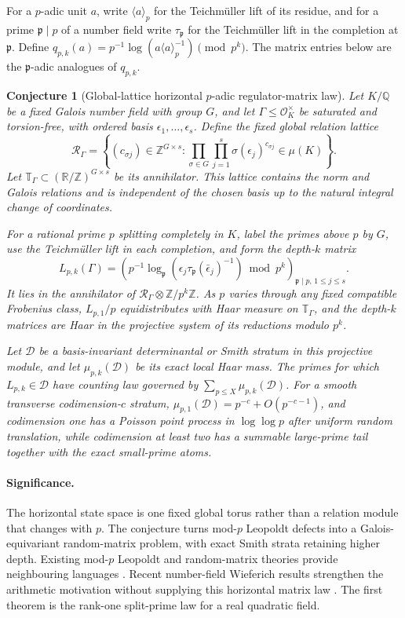 \documentclass[11pt]{article}
\newtheorem{conjecture}{Conjecture}
\newcommand{\Z}{\mathbb Z}
\newcommand{\Q}{\mathbb Q}
\newcommand{\R}{\mathbb R}
\begin{document}
For a $p$-adic unit $a$, write $\langle a\rangle_p$ for the Teichm\"uller lift of
its residue, and for a prime $\mathfrak p\mid p$ of a number field write
$\tau_{\mathfrak p}$ for the Teichm\"uller lift in the completion at
$\mathfrak p$.  Define
$ q_{p,k}(a)=p^{-1}\log(a\langle a\rangle_p^{-1})\pmod{p^k}$.  The matrix entries
below are the $\mathfrak p$-adic analogues of $q_{p,k}$.

\begin{conjecture}[Global-lattice horizontal $p$-adic regulator-matrix law]\label{c14}
Let $K/\Q$ be a fixed Galois number field with group $G$, and let
$\Gamma\le\mathcal O_K^\times$ be saturated and torsion-free, with ordered basis
$\epsilon_1,\ldots,\epsilon_s$.  Define the fixed global relation lattice
\[
 \mathcal R_\Gamma=
 \left\{(c_{\sigma j})\in\Z^{G\times s}:
   \prod_{\sigma\in G}\prod_{j=1}^s
   \sigma(\epsilon_j)^{c_{\sigma j}}\in\mu(K)\right\}.
\]
Let $\mathbb T_\Gamma\subset(\R/\Z)^{G\times s}$ be its annihilator.  This lattice
contains the norm and Galois relations and is independent of the chosen basis up to the
natural integral change of coordinates.

For a rational prime $p$ splitting completely in $K$, label the primes above $p$ by
$G$, use the Teichm\"uller lift in each completion, and form the depth-$k$ matrix
\[
 L_{p,k}(\Gamma)=
 \left(p^{-1}\log_{\mathfrak p}
   (\epsilon_j\tau_{\mathfrak p}(\bar\epsilon_j)^{-1})
   \bmod p^k\right)_{\mathfrak p\mid p,\,1\le j\le s}.
\]
It lies in the annihilator of
$\mathcal R_\Gamma\otimes\Z/p^k\Z$.  As $p$ varies through any fixed compatible
Frobenius class, $L_{p,1}/p$ equidistributes with Haar measure on
$\mathbb T_\Gamma$, and the depth-$k$ matrices are Haar in the projective system of its
reductions modulo $p^k$.

Let $\mathcal D$ be a basis-invariant determinantal or Smith stratum in this projective
module, and let $\mu_{p,k}(\mathcal D)$ be its exact local Haar mass.  The primes for
which $L_{p,k}\in\mathcal D$ have counting law governed by
$\sum_{p\le X}\mu_{p,k}(\mathcal D)$.  For a smooth transverse codimension-$c$ stratum,
$\mu_{p,1}(\mathcal D)=p^{-c}+O(p^{-c-1})$, and codimension one has a Poisson point process
in $\log\log p$ after uniform random translation, while codimension at least two has a
summable large-prime tail together with the exact small-prime atoms.
\end{conjecture}

\paragraph{Significance.}
The horizontal state space is one fixed global torus rather than a relation module that
changes with $p$.  The conjecture turns mod-$p$ Leopoldt defects into a Galois-equivariant
random-matrix problem, with exact Smith strata retaining higher depth.  Existing
mod-$p$ Leopoldt and random-matrix theories provide neighbouring languages
\cite{BGKK,WangStanley,VanPeski}.  Recent number-field Wieferich results strengthen the
arithmetic motivation without supplying this horizontal matrix law
\cite{FelliniMurty,LiZhao}.  The first theorem is the rank-one split-prime law for a real
quadratic field.
\end{document}
